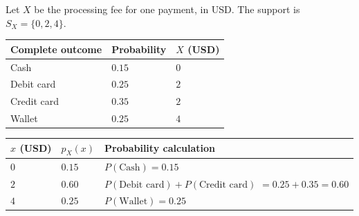 \vspace{-6mm}
\begin{center}
	 \vspace{-10mm}
\end{center}

{Let $X$ be the processing fee for one payment, in USD. The
  support is $S_X=\{0,2,4\}$.}
\vspace{-3mm}
\par%
\noindent%
\begin{minipage}[t]{.28\linewidth}%
  \vspace{0pt}
  \small%
  \setlength{\tabcolsep}{3pt}
  \begin{tabularx}{\linewidth}{@{}>{\raggedright\arraybackslash}X >{\centering\arraybackslash}p{.31\linewidth}
    >{\centering\arraybackslash}p{.20\linewidth}@{}}%
    \toprule
    Complete outcome & Probability & $X$ (USD) \\ \midrule
    Cash & $0.15$ & $0$ \\
    Debit card & $0.25$ & $2$ \\
    Credit card & $0.35$ & $2$ \\
    Wallet & $0.25$ & $4$ \\
    \bottomrule%
  \end{tabularx}
\end{minipage}%
\hfill%
\begin{minipage}[t]{.40\linewidth}%
  \vspace{0pt}
  \small%
  \setlength{\tabcolsep}{3pt}
  \begin{tabularx}{\linewidth}{@{}>{\centering\arraybackslash}p{.15\linewidth}
    >{\centering\arraybackslash}p{.19\linewidth} >{\raggedright\arraybackslash}X@{}}%
    \toprule
    $x$ (USD) & $p_X(x)$ & Probability calculation \\ \midrule
    $0$ & $0.15$ & $P(\text{Cash})=0.15$ \\
    $2$ & $0.60$ & $P(\text{Debit card})$\newline ${}+P(\text{Credit card})$\newline
    $=0.25+0.35=0.60$ \\
    $4$ & $0.25$ & $P(\text{Wallet})=0.25$ \\
    \bottomrule%
  \end{tabularx}
\end{minipage}%
\hfill%
